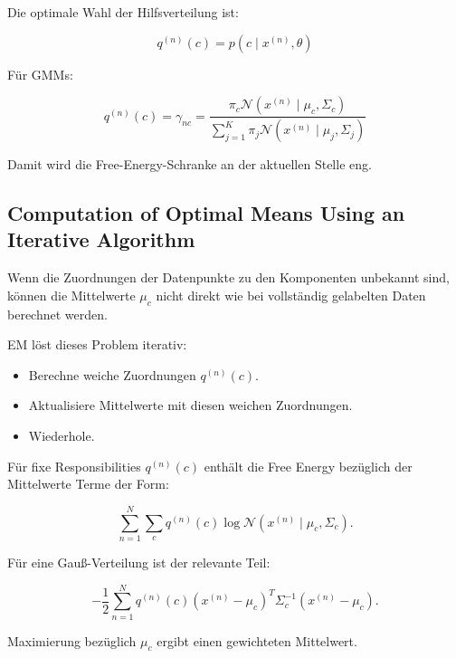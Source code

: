 \documentclass[11pt,a4paper]{scrartcl}
\begin{document}
\begin{answerbox}
    Die optimale Wahl der Hilfsverteilung ist:

    \[
        \boxed{
            q^{(n)}(c)
            =
            p(c\mid x^{(n)},\theta)
        }
    \]

    Für GMMs:

    \[
        \boxed{
            q^{(n)}(c)
            =
            \gamma_{nc}
            =
            \frac{
                \pi_c
                \mathcal{N}(x^{(n)}\mid \mu_c,\Sigma_c)
            }{
                \sum_{j=1}^{K}
                \pi_j
                \mathcal{N}(x^{(n)}\mid \mu_j,\Sigma_j)
            }
        }
    \]

    Damit wird die Free-Energy-Schranke an der aktuellen Stelle eng.
\end{answerbox}

\subsection{Computation of Optimal Means Using an Iterative Algorithm}

\begin{notebox}
    Wenn die Zuordnungen der Datenpunkte zu den Komponenten unbekannt sind,
    können die Mittelwerte \(\mu_c\) nicht direkt wie bei vollständig gelabelten
    Daten berechnet werden.

    EM löst dieses Problem iterativ:

    \begin{itemize}
        \item Berechne weiche Zuordnungen \(q^{(n)}(c)\).
        \item Aktualisiere Mittelwerte mit diesen weichen Zuordnungen.
        \item Wiederhole.
    \end{itemize}
\end{notebox}

\begin{calculationbox}
    Für fixe Responsibilities \(q^{(n)}(c)\) enthält die Free Energy bezüglich
    der Mittelwerte Terme der Form:

    \[
        \sum_{n=1}^{N}
        \sum_c
        q^{(n)}(c)
        \log
        \mathcal{N}(x^{(n)}\mid \mu_c,\Sigma_c).
    \]

    Für eine Gauß-Verteilung ist der relevante Teil:

    \[
        -
        \frac{1}{2}
        \sum_{n=1}^{N}
        q^{(n)}(c)
        (x^{(n)}-\mu_c)^T
        \Sigma_c^{-1}
        (x^{(n)}-\mu_c).
    \]

    Maximierung bezüglich \(\mu_c\) ergibt einen gewichteten Mittelwert.
\end{calculationbox}
\end{document}
